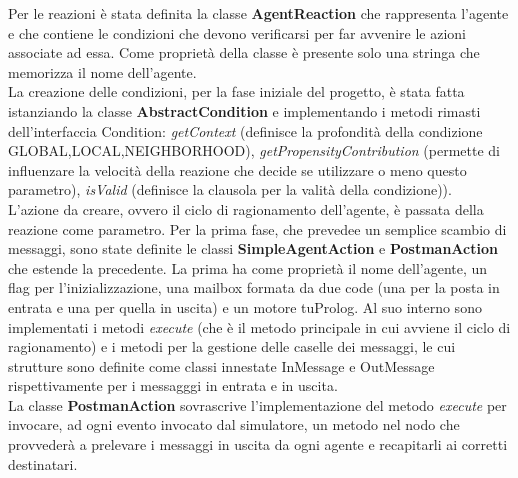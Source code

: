 \documentclass[12pt,a4paper,openright,twoside]{report}
\begin{document}
Per le reazioni \`e stata definita la classe \textbf{AgentReaction} che rappresenta l'agente e che contiene le condizioni che devono verificarsi per far avvenire le azioni associate ad essa. Come propriet\`a della classe \`e presente solo una stringa che memorizza il nome dell'agente.
\\La creazione delle condizioni, per la fase iniziale del progetto, \`e stata fatta istanziando la classe \textbf{AbstractCondition} e implementando i metodi rimasti dell'interfaccia Condition: \textit{getContext} (definisce la profondit\`a della condizione GLOBAL,LOCAL,NEIGHBORHOOD), \textit{getPropensityContribution} (permette di influenzare la velocità della reazione che decide se utilizzare o meno questo parametro), \textit{isValid} (definisce la clausola per la valit\`a della condizione)).
\\L'azione da creare, ovvero il ciclo di ragionamento dell'agente, \`e passata della reazione come parametro. Per la prima fase, che prevedee un semplice scambio di messaggi, sono state definite le classi \textbf{SimpleAgentAction} e \textbf{PostmanAction} che estende la precedente. La prima ha come proprietà il nome dell'agente, un flag per l'inizializzazione, una mailbox formata da due code (una per la posta in entrata e una per quella in uscita) e un motore tuProlog. Al suo interno sono implementati i metodi \textit{execute} (che \`e il metodo principale in cui avviene il ciclo di ragionamento) e i metodi per la gestione delle caselle dei messaggi, le cui strutture sono definite come classi innestate InMessage e OutMessage rispettivamente per i messagggi in entrata e in uscita.
\\La classe \textbf{PostmanAction} sovrascrive l'implementazione del metodo \textit{execute} per invocare, ad ogni evento invocato dal simulatore, un metodo nel nodo che provveder\`a a prelevare i messaggi in uscita da ogni agente e recapitarli ai corretti destinatari.




\end{document}

